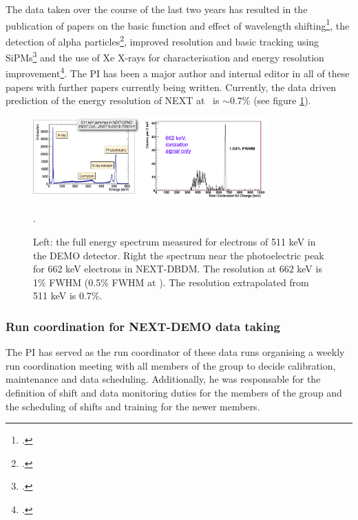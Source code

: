 \documentclass[a4paper,11pt,oneside]{article}
\begin{document}
The data taken over the course of the last two years has resulted in the publication of papers on the basic function and effect of wavelength shifting\footcite{Alvarez:2012xda}, the detection of alpha particles\footcite{Alvarez:2012hu}, improved resolution and basic tracking using SiPMs\footcite{Alvarez:2013gxa} and the use of Xe X-rays for characterisation and energy resolution improvement\footcite{Lorca:2014sra}. The PI has been a major author and internal editor in all of these papers with further papers currently being written. Currently, the data driven prediction of the energy resolution of NEXT at \Qbb\ is $\sim$0.7\% (see figure \ref{fig.ERES}).
\begin{figure}
  \centering
  \includegraphics[width=0.8\textwidth]{img/EResolution.png}
  \caption{\small Left: the full energy spectrum measured for electrons of 511 keV in the DEMO detector. Right the spectrum near the photoelectric peak for 662 keV electrons in NEXT-DBDM. The resolution at 662 keV is 1\% FWHM (0.5\% FWHM at \Qbb). The resolution extrapolated from 511 keV is 0.7\%.}\label{fig.ERES}. 
\end{figure}

\subsubsection*{Run coordination for NEXT-DEMO data taking}
The PI has served as the run coordinator of these data runs organising a weekly run coordination meeting with all members of the group to decide calibration, maintenance and data scheduling. Additionally, he was responsable for the definition of shift and data monitoring duties for the members of the group and the scheduling of shifts and training for the newer members.
\end{document}

